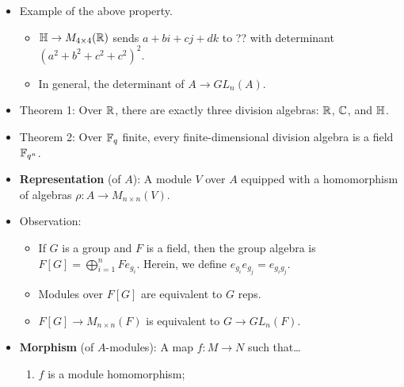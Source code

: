 \documentclass[../notes.tex]{subfiles}
\begin{document}
\begin{itemize}
\begin{enumerate}
\begin{proof}
            Then $\C\to M_{2\times 2}(\R)$ sends
            \begin{equation*}
                a+bi\mapsto L_{a+bi} =
                \begin{bmatrix}
                    \alpha & -\beta\\
                    \beta & \alpha\\
                \end{bmatrix}
            \end{equation*}
            Then $L_aL_b=L_{ab}$ and $L_a+L_b=L_{a^{-1}b}$, so $L_a$ has eigenvalue $\lambda$, so $L_ax=ax=\lambda x$, so $a=\lambda\cdot 1$.

            What is going on here and how does this work??
        \end{proof}
    \end{enumerate}
    \item Example of the above property.
    \begin{itemize}
        \item $\mathbb{H}\to M_{4\times 4}(\mathbb{R})$ sends $a+bi+cj+dk$ to ?? with determinant $(a^2+b^2+c^2+c^2)^2$.
        \item In general, the determinant of $A\to GL_n(A)$.
    \end{itemize}
    \item Theorem 1: Over $\mathbb{R}$, there are exactly three division algebras: $\mathbb{R}$, $\mathbb{C}$, and $\mathbb{H}$.
    \item Theorem 2: Over $\mathbb{F}_q$ finite, every finite-dimensional division algebra is a field $\mathbb{F}_{q^n}$.
    \item \textbf{Representation} (of $A$): A module $V$ over $A$ equipped with a homomorphism of algebras $\rho:A\to M_{n\times n}(V)$.
    \item Observation:
    \begin{itemize}
        \item If $G$ is a group and $F$ is a field, then the group algebra is $F[G]=\bigoplus_{i=1}^nFe_{g_i}$. Herein, we define $e_{g_i}e_{g_j}=e_{g_ig_j}$.
        \item Modules over $F[G]$ are equivalent to $G$ reps.
        \item $F[G]\to M_{n\times n}(F)$ is equivalent to $G\to GL_n(F)$.
    \end{itemize}
    \item \textbf{Morphism} (of $A$-modules): A map $f:M\to N$ such that\dots
    \begin{enumerate}
        \item $f$ is a module homomorphism;

\end{enumerate}
\end{itemize}
\end{document}

